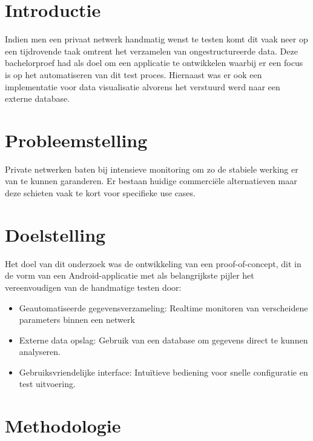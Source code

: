 \documentclass[a0,portrait]{hogent-poster}
\begin{document}
\begin{multicols}{2} %

\section{Introductie}

Indien men een privaat netwerk handmatig wenst te testen komt dit vaak neer op een tijdrovende taak omtrent het verzamelen van ongestructureerde data.
Deze bachelorproef had als doel om een applicatie te ontwikkelen waarbij er een focus is op het automatiseren van dit test proces. Hiernaast was er ook een implementatie voor data visualisatie alvorens het verstuurd werd naar een externe database. 

\section{Probleemstelling}

Private netwerken baten bij intensieve monitoring om zo de stabiele werking er van te kunnen garanderen. Er bestaan huidige commerciële alternatieven maar deze schieten vaak te kort voor specifieke use cases.

\section{Doelstelling}

Het doel van dit onderzoek was de ontwikkeling van een proof-of-concept, dit in de vorm van een Android-applicatie met als belangrijkste pijler het vereenvoudigen van de handmatige testen door:

\begin{itemize}
    \item Geautomatiseerde gegevensverzameling: Realtime monitoren van verscheidene parameters binnen een netwerk
    \item Externe data opslag: Gebruik van een database om gegevens direct te kunnen analyseren.
    \item Gebruiksvriendelijke interface: Intuïtieve bediening voor snelle configuratie en test uitvoering.
\end{itemize}

\section{Methodologie}


\end{multicols}
\end{document}

